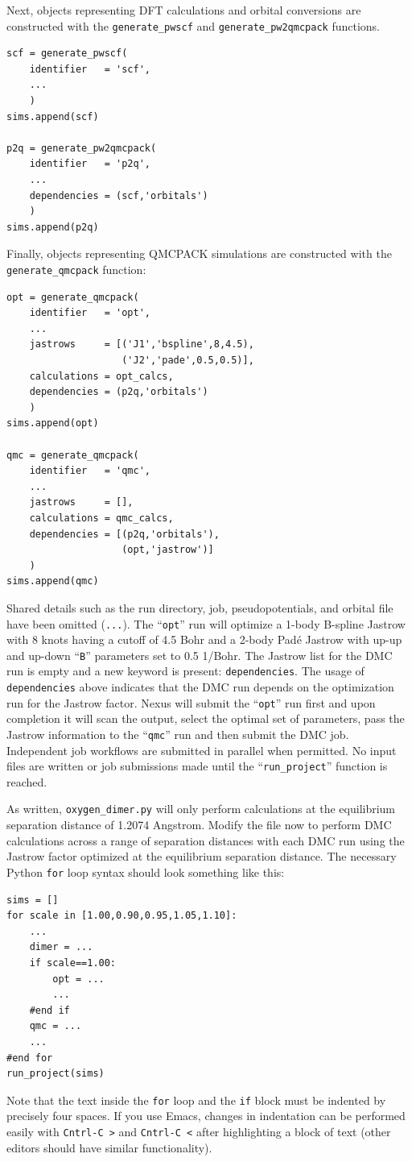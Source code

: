 \documentclass[oneside,11pt]{memoir}
\numberwithin{equation}{section}
\begin{document}
Next, objects representing DFT calculations and orbital conversions are constructed with the \texttt{generate\_pwscf} and \texttt{generate\_pw2qmcpack} functions.
\begin{verbatim}
scf = generate_pwscf(
    identifier   = 'scf',
    ...
    )
sims.append(scf)

p2q = generate_pw2qmcpack(
    identifier   = 'p2q',
    ...
    dependencies = (scf,'orbitals')
    )
sims.append(p2q)
\end{verbatim}

Finally, objects representing QMCPACK simulations are constructed with the \texttt{generate\_qmcpack} function:
\begin{verbatim}
opt = generate_qmcpack(
    identifier   = 'opt',
    ...
    jastrows     = [('J1','bspline',8,4.5), 
                    ('J2','pade',0.5,0.5)],
    calculations = opt_calcs,
    dependencies = (p2q,'orbitals')
    )
sims.append(opt)

qmc = generate_qmcpack(
    identifier   = 'qmc',
    ...
    jastrows     = [],            
    calculations = qmc_calcs,
    dependencies = [(p2q,'orbitals'),
                    (opt,'jastrow')]
    )
sims.append(qmc)
\end{verbatim}
\noindent
Shared details such as the run directory, job, pseudopotentials, and orbital file have been omitted (\texttt{...}).  The ``\texttt{opt}'' run will optimize a 1-body B-spline Jastrow with 8 knots having a cutoff of 4.5 Bohr and a 2-body Pad\'{e} Jastrow with up-up and up-down ``\texttt{B}'' parameters set to 0.5 1/Bohr.  The Jastrow list for the DMC run is empty and a new keyword is present: \texttt{dependencies}.  The usage of \texttt{dependencies} above indicates that the DMC run depends on the optimization run for the Jastrow factor.  Nexus will submit the ``\texttt{opt}'' run first and upon completion it will scan the output, select the optimal set of parameters, pass the Jastrow information to the ``\texttt{qmc}'' run and then submit the DMC job.  Independent job workflows are submitted in parallel when permitted.  No input files are written or job submissions made until the ``\texttt{run\_project}'' function is reached.

As written, \texttt{oxygen\_dimer.py} will only perform calculations at the equilibrium separation distance of 1.2074 Angstrom.  Modify the file now to perform DMC calculations across a range of separation distances with each DMC run using the Jastrow factor optimized at the equilibrium separation distance.  The necessary Python \texttt{for} loop syntax should look something like this:
\begin{verbatim}
sims = []
for scale in [1.00,0.90,0.95,1.05,1.10]:
    ...
    dimer = ...
    if scale==1.00:
        opt = ...
        ...
    #end if
    qmc = ...
    ...
#end for
run_project(sims)
\end{verbatim}
\noindent
Note that the text inside the \texttt{for} loop and the \texttt{if} block must be indented by precisely four spaces.  If you use Emacs, changes in indentation can be performed easily with \texttt{Cntrl-C >} and \texttt{Cntrl-C <} after highlighting a block of text (other editors should have similar functionality).  
\end{document}
